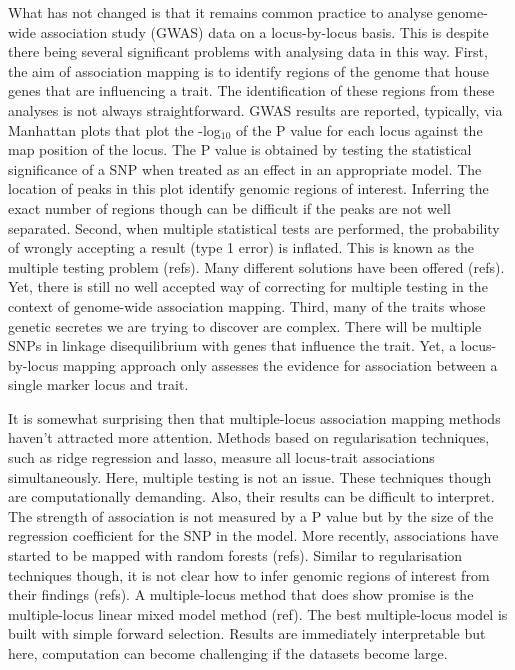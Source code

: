 \documentclass{nature}
\begin{document}
What has not changed is that it remains common practice to analyse genome-wide association study (GWAS) data on a locus-by-locus basis. This is despite there being several significant problems with analysing data in this way. 
First, the aim of association mapping is to identify regions of the genome that house genes that are influencing a trait. 
The identification of these regions from these analyses is not always straightforward. GWAS results are reported, typically, via Manhattan plots 
that plot the -log$_{10}$ of the P value for each locus against the map position of the locus. The P value is obtained by testing the statistical 
significance of a SNP when treated as an effect in an appropriate model. 
The location of peaks in this plot identify genomic 
regions of interest. Inferring the exact number of regions though can be difficult if the peaks are not well separated. Second, when multiple statistical tests are performed, the probability of wrongly accepting a result (type 1 error) is inflated. This is known as the multiple testing problem (refs). Many different solutions have been offered (refs). Yet, there is still no well accepted way of correcting for multiple testing in the context of genome-wide association mapping. Third, many of the traits whose genetic secretes we are trying to discover are complex. There will be multiple SNPs in linkage disequilibrium with genes that influence the trait. Yet, a locus-by-locus mapping approach only assesses the evidence for association between a single marker locus and trait.

It is somewhat surprising then that multiple-locus association mapping methods haven't attracted more attention. Methods based on 
regularisation techniques, such as ridge regression and lasso, measure all locus-trait associations simultaneously. 
Here, multiple testing is not an issue. These techniques though are computationally demanding. Also, their results can be difficult to interpret. The strength of association is not measured by a P value but by the size of the regression coefficient for the SNP in the model. More recently, associations have started to be mapped with random forests (refs). Similar to regularisation techniques though, it is not clear how to infer genomic regions of interest from their findings (refs). A multiple-locus method that does show promise is the multiple-locus linear mixed model method (ref). The best multiple-locus model is built with simple forward selection. Results are immediately interpretable but here, computation can become challenging if the datasets become large.
\end{document}
